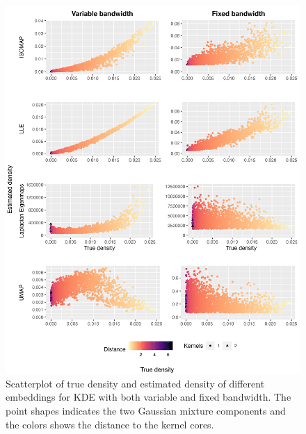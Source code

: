 \documentclass[11pt,a4paper,]{article}
\begin{document}
\begin{figure}

{\centering \includegraphics[width=0.95\linewidth]{figures/fived_density_comparison_4ml_riem20} 

}

\caption{Scatterplot of true density and estimated density of different embeddings for KDE with both variable and fixed bandwidth. The point shapes indicates the two Gaussian mixture components and the colors shows the distance to the kernel cores.}\label{fig:fivedisomapden}
\end{figure}
\end{document}
